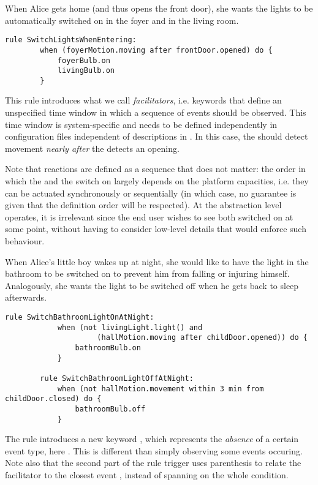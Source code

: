 \begin{description}[leftmargin=0cm]
	\item[Switching entrance lights on when coming in]  When Alice gets home (and thus opens the front door), she wants the lights to be automatically switched on in the foyer and in the living room.
	\begin{lstlisting}[language=iotdsl,
							label=lis:home-rule,
		caption=Rule to switch on the lights at home incoming]
	rule SwitchLightsWhenEntering:
		when (foyerMotion.moving after frontDoor.opened) do {
			foyerBulb.on
			livingBulb.on
		}
	\end{lstlisting}
	This rule introduces what we call \emph{facilitators}, i.e. keywords that define an unspecified time window in which a sequence of events should be observed. This time window is system-specific and needs to be defined independently in configuration files independent of descriptions in \IOTDSL. In this case, the  should detect movement \emph{nearly after} the  detects an opening. 
		
	Note that reactions are defined as a sequence that does not matter: the order in which the  and the  switch on largely depends on the platform capacities, i.e. they can be actuated synchronously or sequentially (in which case, no guarantee is given that the definition order will be respected). At the abstraction level \IOTDSL operates, it is irrelevant since the end user wishes to see both switched on at some point, without having to consider low-level details that would enforce such behaviour.

	\item[Illuminate bathroom when children wake up at night] When Alice's little boy wakes up at night, she would like to have the light in the bathroom to be switched on to prevent him from falling or injuring himself. Analogously, she wants the light to be switched off when he gets back to sleep afterwards.
	\begin{lstlisting}[language=iotdsl,
							label=lis:night-rule,
		caption=Rules to switch on\//off lights in the corridor at night]
		rule SwitchBathroomLightOnAtNight:	
			when (not livingLight.light() and 
					 (hallMotion.moving after childDoor.opened)) do {
				bathroomBulb.on
			}
  
		rule SwitchBathroomLightOffAtNight:	
			when (not hallMotion.movement within 3 min from childDoor.closed) do {
				bathroomBulb.off
			}
	\end{lstlisting}
	The rule  introduces a new keyword , which represents the \emph{absence} of a certain event type, here . This is different than simply observing some events occuring. Note also that the second part of the rule trigger uses parenthesis to relate the facilitator  to the closest event , instead of spanning on the whole condition.


\end{description}
